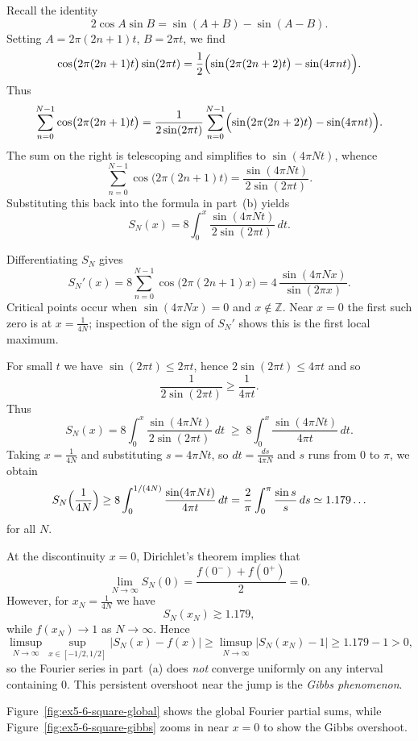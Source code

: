 \begin{problem}[CP-II-0404]
\bigskip

Recall the identity
\[
2\cos A\sin B = \sin(A+B)-\sin(A-B).
\]
Setting $A=2\pi(2n+1)t$, $B=2\pi t$, we find
\[
\cos\bigl(2\pi(2n+1)t\bigr)\sin(2\pi t)
= \frac12\Bigl(\sin\bigl(2\pi(2n+2)t\bigr)
-\sin(4\pi n t)\Bigr).
\]
Thus
\[
\sum_{n=0}^{N-1}\cos\bigl(2\pi(2n+1)t\bigr)
= \frac{1}{2\sin(2\pi t)}
\sum_{n=0}^{N-1}
\Bigl(\sin\bigl(2\pi(2n+2)t\bigr)
-\sin(4\pi n t)\Bigr).
\]
The sum on the right is telescoping and simplifies to $\sin(4\pi N t)$,
whence
\[
\sum_{n=0}^{N-1}\cos\bigl(2\pi(2n+1)t\bigr)
= \frac{\sin(4\pi N t)}{2\sin(2\pi t)}.
\]
Substituting this back into the formula in part~(b) yields
\[
S_N(x)
= 8\int_0^x \frac{\sin(4\pi N t)}{2\sin(2\pi t)}\,dt.
\]

\bigskip

Differentiating $S_N$ gives
\[
S_N'(x)
= 8\sum_{n=0}^{N-1}\cos\bigl(2\pi(2n+1)x\bigr)
= 4\,\frac{\sin(4\pi N x)}{\sin(2\pi x)}.
\]
Critical points occur when $\sin(4\pi N x)=0$ and $x\notin\mathbb{Z}$.
Near $x=0$ the first such zero is at $x=\tfrac{1}{4N}$; inspection of
the sign of $S_N'$ shows this is the first local maximum.

For small $t$ we have $\sin(2\pi t)\le 2\pi t$, hence
$2\sin(2\pi t)\le 4\pi t$ and so
\[
\frac{1}{2\sin(2\pi t)} \ge \frac{1}{4\pi t}.
\]
Thus
\[
S_N(x)
= 8\int_0^x \frac{\sin(4\pi N t)}{2\sin(2\pi t)}\,dt
\;\ge\;
8\int_0^x \frac{\sin(4\pi N t)}{4\pi t}\,dt.
\]
Taking $x=\tfrac{1}{4N}$ and substituting $s=4\pi N t$, so
$dt = \tfrac{ds}{4\pi N}$ and $s$ runs from $0$ to $\pi$, we obtain
\[
S_N\Bigl(\frac{1}{4N}\Bigr)
\ge 8\int_0^{1/(4N)} \frac{\sin(4\pi N t)}{4\pi t}\,dt
= \frac{2}{\pi}\int_0^{\pi} \frac{\sin s}{s}\,ds
\simeq 1.179\ldots
\]
for all $N$.

\bigskip

At the discontinuity $x=0$, Dirichlet's theorem implies that
\[
\lim_{N\to\infty} S_N(0)
= \frac{f(0^-)+f(0^+)}{2}
= 0.
\]
However, for $x_N = \tfrac{1}{4N}$ we have
\[
S_N(x_N) \gtrsim 1.179,
\]
while $f(x_N)\to 1$ as $N\to\infty$.  Hence
\[
\limsup_{N\to\infty}\sup_{x\in[-1/2,1/2]}
|S_N(x)-f(x)|
\ge \limsup_{N\to\infty}|S_N(x_N)-1|
\ge 1.179 - 1 > 0,
\]
so the Fourier series in part~(a) does \emph{not} converge uniformly on
any interval containing $0$.  This persistent overshoot near the jump is
the \emph{Gibbs phenomenon}.

\bigskip

Figure~\ref{fig:ex5-6-square-global} shows the global Fourier partial sums, while Figure~\ref{fig:ex5-6-square-gibbs} zooms in near $x=0$ to show the Gibbs overshoot.


\end{problem}
